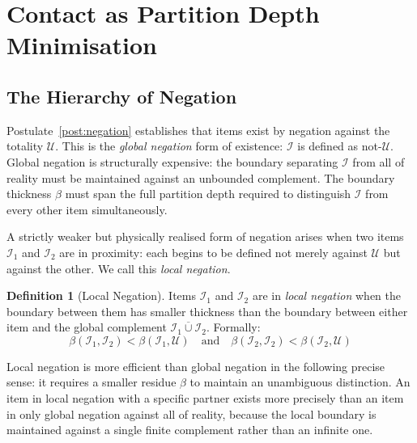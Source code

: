 \documentclass[11pt,twocolumn,a4paper]{article}
\theoremstyle{plain}
\theoremstyle{definition}
\newtheorem{definition}[theorem]{Definition}
\theoremstyle{remark}
\begin{document}

\section{Contact as Partition Depth Minimisation}
\label{sec:contact}

\subsection{The Hierarchy of Negation}
\label{subsec:neg_hierarchy}

Postulate~\ref{post:negation} establishes that items exist by negation against
the totality $\mathcal{U}$. This is the \emph{global negation} form of
existence: $\mathcal{I}$ is defined as not-$\mathcal{U}$. Global negation is
structurally expensive: the boundary separating $\mathcal{I}$ from all of
reality must be maintained against an unbounded complement. The boundary
thickness $\beta$ must span the full partition depth required to distinguish
$\mathcal{I}$ from every other item simultaneously.

A strictly weaker but physically realised form of negation arises when two
items $\mathcal{I}_1$ and $\mathcal{I}_2$ are in proximity: each begins to be
defined not merely against $\mathcal{U}$ but against the other. We call this
\emph{local negation}.

\begin{definition}[Local Negation]
\label{def:local_neg}
Items $\mathcal{I}_1$ and $\mathcal{I}_2$ are in \emph{local negation} when
the boundary between them has smaller thickness than the boundary between either
item and the global complement $\overline{\mathcal{I}_1 \cup \mathcal{I}_2}$.
Formally:
\begin{equation}
    \beta(\mathcal{I}_1, \mathcal{I}_2) < \beta(\mathcal{I}_1, \mathcal{U})
    \quad \text{and} \quad
    \beta(\mathcal{I}_2, \mathcal{I}_2) < \beta(\mathcal{I}_2, \mathcal{U})
    \label{eq:local_neg}
\end{equation}
\end{definition}

Local negation is more efficient than global negation in the following precise
sense: it requires a smaller residue $\beta$ to maintain an unambiguous
distinction. An item in local negation with a specific partner exists more
precisely than an item in only global negation against all of reality, because
the local boundary is maintained against a single finite complement rather than
an infinite one.
\end{document}
